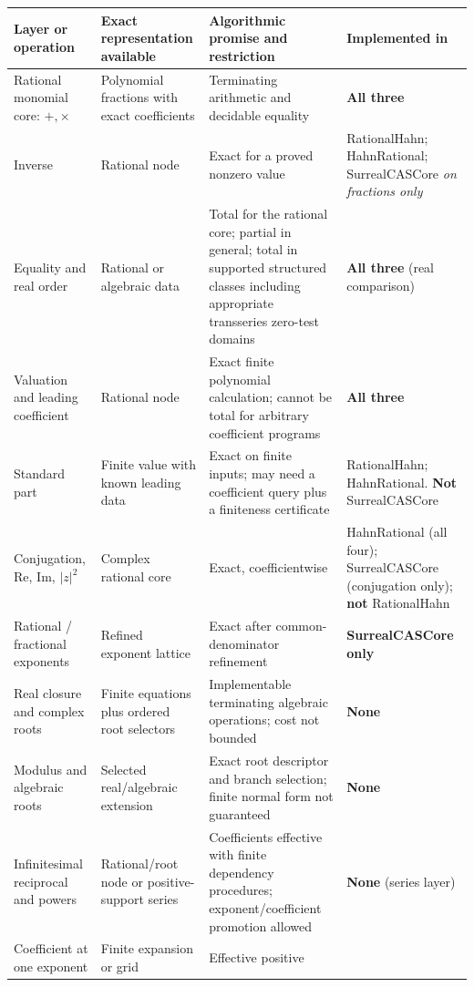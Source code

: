 \documentclass[11pt,letterpaper]{article}
\numberwithin{equation}{section}
\theoremstyle{definition}
\theoremstyle{remark}
\begin{document}
\begingroup\footnotesize
\begin{longtable}{@{}P{0.175\textwidth}P{0.235\textwidth}P{0.295\textwidth}P{0.205\textwidth}@{}}
\toprule
Layer or operation & Exact representation available &
Algorithmic promise and restriction & Implemented in\\
\midrule\endhead
Rational monomial core: $+,\times$ & Polynomial fractions with exact
coefficients & Terminating arithmetic and decidable equality &
\textbf{All three}\\[0.35em]
Inverse & Rational node & Exact for a proved nonzero value &
RationalHahn; HahnRational; SurrealCASCore \emph{on fractions only}\\[0.35em]
Equality and real order & Rational or algebraic data & Total for the rational
core; partial in general; total in supported structured classes including
appropriate transseries zero-test domains & \textbf{All three} (real
comparison)\\[0.35em]
Valuation and leading coefficient & Rational node & Exact finite polynomial
calculation; cannot be total for arbitrary coefficient programs &
\textbf{All three}\\[0.35em]
Standard part & Finite value with known leading data & Exact on finite inputs;
may need a coefficient query plus a finiteness certificate &
RationalHahn; HahnRational. \textbf{Not} SurrealCASCore\\[0.35em]
Conjugation, $\mathrm{Re}$, $\mathrm{Im}$, $|z|^2$ & Complex rational core &
Exact, coefficientwise & HahnRational (all four); SurrealCASCore (conjugation
only); \textbf{not} RationalHahn\\[0.35em]
Rational / fractional exponents & Refined exponent lattice & Exact after
common-denominator refinement & \textbf{SurrealCASCore only}\\[0.35em]
Real closure and complex roots & Finite equations plus ordered root selectors &
Implementable terminating algebraic operations; cost not bounded &
\textbf{None}\\[0.35em]
Modulus and algebraic roots & Selected real/algebraic extension & Exact root
descriptor and branch selection; finite normal form not guaranteed &
\textbf{None}\\[0.35em]
Infinitesimal reciprocal and powers & Rational/root node or positive-support
series & Coefficients effective with finite dependency procedures;
exponent/coefficient promotion allowed & \textbf{None} (series layer)\\[0.35em]
Coefficient at one exponent & Finite expansion or grid & Effective positive

\end{longtable}
\end{document}
